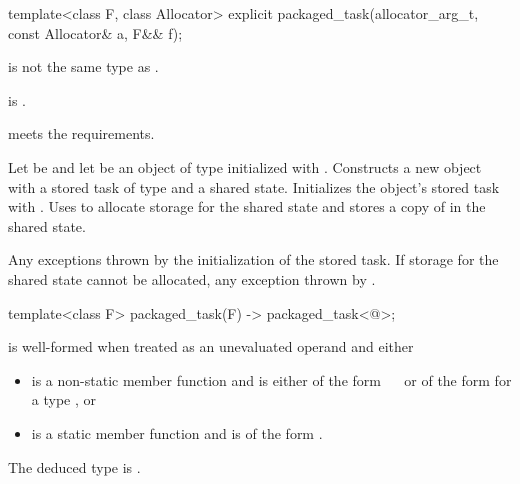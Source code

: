 %
\begin{itemdecl}
template<class F, class Allocator>
  explicit packaged_task(allocator_arg_t, const Allocator& a, F&& f);
\end{itemdecl}

\begin{itemdescr}
\pnum
\constraints
{}
is not the same type as .

\pnum
\mandates
{} is .

\pnum
\expects
{} meets the  requirements.

\pnum
\effects
Let  be
and let  be an object of type  initialized with
.
Constructs a new  object with
a stored task of type  and a shared state.
Initializes the object's stored task with .
Uses  to allocate storage for the shared state and stores a copy
of  in the shared state.

\pnum
\throws
Any exceptions thrown by the initialization of the stored task.
If storage for the shared state cannot be allocated, any exception thrown by
.
\end{itemdescr}

%
\begin{itemdecl}
template<class F> packaged_task(F) -> packaged_task<@\seebelow@>;
\end{itemdecl}

\begin{itemdescr}
\pnum
\constraints
{} is well-formed when
treated as an unevaluated operand and either
\begin{itemize}
\item
{} is a non-static member function and
 is either of the form
~\cv{}~
or of the form
for a type , or
\item
{} is a static member function and
 is of the form
.
\end{itemize}

\pnum
\remarks
The deduced type is .
\end{itemdescr}

